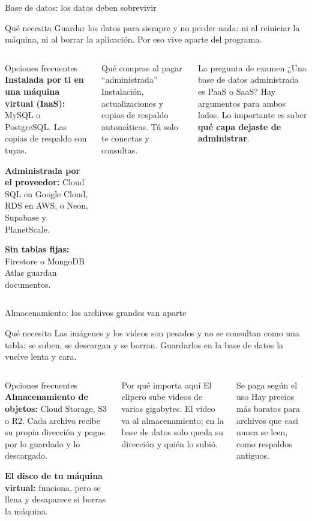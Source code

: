 \documentclass[aspectratio=169,10pt,c]{beamer}
\begin{document}
\begin{frame}{Base de datos: los datos deben sobrevivir}
\begin{block}{Qué necesita}
\small Guardar los datos para siempre y no perder nada: ni al reiniciar la máquina, ni al borrar la aplicación. Por eso vive aparte del programa.
\end{block}
\begin{columns}[T,onlytextwidth]
\begin{exampleblock}{Opciones frecuentes}
\small
\textbf{Instalada por ti en una máquina virtual (IaaS):} MySQL o PostgreSQL. Las copias de respaldo son tuyas.\par\smallskip
\textbf{Administrada por el proveedor:} Cloud SQL en Google Cloud, RDS en AWS, o Neon, Supabase y PlanetScale.\par\smallskip
\textbf{Sin tablas fijas:} Firestore o MongoDB Atlas guardan documentos.
\end{exampleblock}
\begin{block}{Qué compras al pagar ``administrada''}
\small Instalación, actualizaciones y copias de respaldo automáticas. Tú solo te conectas y consultas.
\end{block}
\begin{alertblock}{La pregunta de examen}
\small ¿Una base de datos administrada es PaaS o SaaS? Hay argumentos para ambos lados. Lo importante es saber \textbf{qué capa dejaste de administrar}.
\end{alertblock}
\end{columns}
\end{frame}

\begin{frame}{Almacenamiento: los archivos grandes van aparte}
\begin{block}{Qué necesita}
\small Las imágenes y los videos son pesados y no se consultan como una tabla: se suben, se descargan y se borran. Guardarlos en la base de datos la vuelve lenta y cara.
\end{block}
\begin{columns}[T,onlytextwidth]
\begin{exampleblock}{Opciones frecuentes}
\small
\textbf{Almacenamiento de objetos:} Cloud Storage, S3 o R2. Cada archivo recibe su propia dirección y pagas por lo guardado y lo descargado.\par\smallskip
\textbf{El disco de tu máquina virtual:} funciona, pero se llena y desaparece si borras la máquina.
\end{exampleblock}
\begin{block}{Por qué importa aquí}
\small El clipero sube videos de varios gigabytes. El video va al almacenamiento; en la base de datos solo queda su dirección y quién lo subió.
\end{block}
\begin{alertblock}{Se paga según el uso}
\small Hay precios más baratos para archivos que casi nunca se leen, como respaldos antiguos.
\end{alertblock}
\end{columns}
\end{frame}
\end{document}
